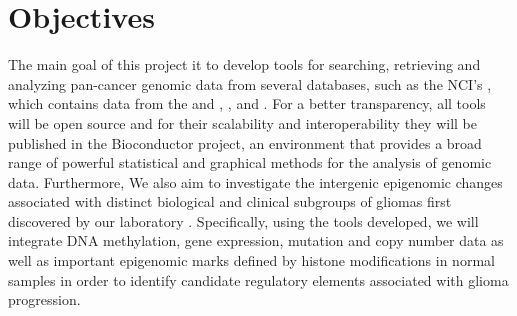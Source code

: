 
\newcommand{\comando}[1]{\textbf{$\backslash$#1}}


\section{Objectives}

The main goal of this project it to develop tools for searching, retrieving and
analyzing pan-cancer genomic data from several databases, such as the NCI's
, which contains data from the 
and ,
, and
.
For a better transparency, all tools will be open source and for their
scalability and interoperability they will be published in the Bioconductor project,
an environment that provides a broad range of powerful statistical and graphical methods
for the analysis of genomic data.
Furthermore, We also aim to investigate the intergenic epigenomic changes
associated with distinct biological and clinical subgroups of gliomas first
discovered by our laboratory \cite{ceccarelli2016molecular}. Specifically,
using the tools developed, we will integrate DNA methylation, gene expression,
mutation and copy number data as well as important epigenomic marks defined by
histone modifications in normal samples in order to identify candidate regulatory
elements associated with glioma progression.


